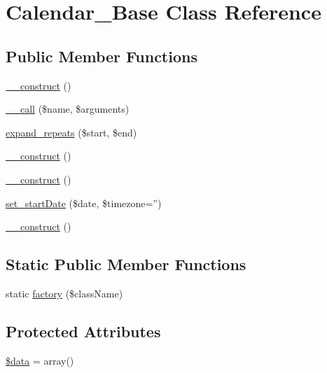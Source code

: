 \hypertarget{classCalendar__Base}{
\section{Calendar\_\-Base Class Reference}
\label{classCalendar__Base}
}
\subsection*{Public Member Functions}
\begin{DoxyCompactItemize}
\item 
\hyperlink{classCalendar__Base_a095c5d389db211932136b53f25f39685}{\_\-\_\-construct} ()
\item 
\hyperlink{classCalendar__Base_a3815af62ed9d37b2dcaa175379bbfeca}{\_\-\_\-call} (\$name, \$arguments)
\item 
\hyperlink{classCalendar__Base_a874ebcd7e488d259eebddc1a2bc83980}{expand\_\-repeats} (\$start, \$end)
\item 
\hyperlink{classCalendar__Base_a095c5d389db211932136b53f25f39685}{\_\-\_\-construct} ()
\item 
\hyperlink{classCalendar__Base_a095c5d389db211932136b53f25f39685}{\_\-\_\-construct} ()
\item 
\hyperlink{classCalendar__Base_ad5b32584e46ed2d74d0c67bcb9e628ee}{set\_\-startDate} (\$date, \$timezone='')
\item 
\hyperlink{classCalendar__Base_a095c5d389db211932136b53f25f39685}{\_\-\_\-construct} ()
\end{DoxyCompactItemize}
\subsection*{Static Public Member Functions}
\begin{DoxyCompactItemize}
\item 
static \hyperlink{classCalendar__Base_a8c0508f1ea0fe72c8d0e6e8dd2a1c41c}{factory} (\$className)
\end{DoxyCompactItemize}
\subsection*{Protected Attributes}
\begin{DoxyCompactItemize}
\item 
\hyperlink{classCalendar__Base_a6efc15b5a2314dd4b5aaa556a375c6d6}{\$data} = array()
\end{DoxyCompactItemize}


